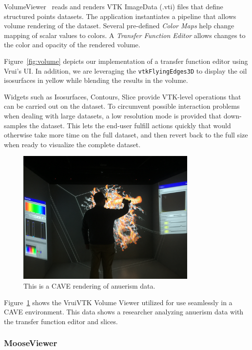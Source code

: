 VolumeViewer~\cite{VolumeViewer} reads and renders VTK ImageData (.vti) files that define structured points datasets.  The application instantiates a pipeline that allows volume rendering of the dataset. Several pre-defined \textit{Color Maps} help change mapping of scalar values to colors. A  \textit{Transfer Function Editor} allows changes to the color and opacity of the rendered volume.

Figure~\ref{fig:volume} depicts our implementation of a transfer function editor using Vrui's UI. In addition, we are leveraging the \texttt{vtkFlyingEdges3D} to display the oil isosurfaces in yellow while blending the results in the volume.

Widgets such as Isosurfaces, Contours, Slice provide VTK-level operations that can be carried out on the dataset. To circumvent possible interaction problems when dealing with large datasets, a low resolution mode is provided that down-samples the dataset. This lets the end-user fulfill actions quickly that would otherwise take more time on the full dataset, and then revert back to the full size when ready to visualize the complete dataset.


\begin{figure}[h!]
 \centering
 \includegraphics[width=3.5in]{images/CAVEVolumeViz.jpg}
 \caption{This is a CAVE rendering of anuerism data. }
 \label{fig:CAVEVolumeViz}
\end{figure}

Figure~\ref{fig:CAVEVolumeViz} shows the VruiVTK Volume Viewer utilized for use seamlessly in a CAVE environment. This data shows a researcher analyzing anuerism data with the transfer function editor and slices.

\subsubsection{MooseViewer}

